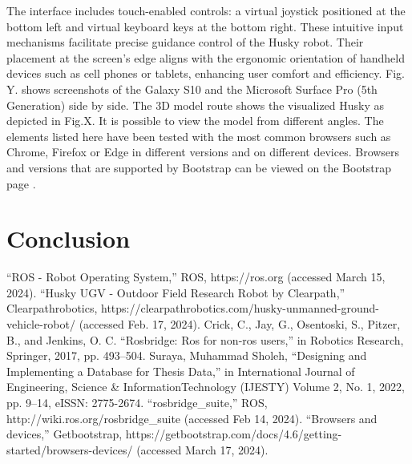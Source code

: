 \documentclass[conference]{IEEEtran}
\begin{document}
The interface includes touch-enabled controls: a virtual joystick positioned at the bottom left and virtual keyboard keys at the bottom right. These intuitive input mechanisms facilitate precise guidance control of the Husky robot. Their placement at the screen's edge aligns with the ergonomic orientation of handheld devices such as cell phones or tablets, enhancing user comfort and efficiency. 
Fig. Y. shows screenshots of the Galaxy S10 and the Microsoft Surface Pro (5th Generation) side by side.
The 3D model route shows the visualized Husky as depicted in Fig.X. It is possible to view the model from different angles.
The elements listed here have been tested with the most common browsers such as Chrome, Firefox or Edge in different versions and on different devices. Browsers and versions that are supported by Bootstrap can be viewed on the Bootstrap page \cite{bsBrowsers}. 






\section{Conclusion}

\begin{thebibliography}{00}
 ``ROS - Robot Operating System,''
ROS,
https://ros.org
(accessed March 15, 2024).
``Husky UGV - Outdoor Field Research Robot by Clearpath,''
Clearpathrobotics,
https://clearpathrobotics.com/husky-unmanned-ground-vehicle-robot/
(accessed Feb. 17, 2024).
 Crick, C., Jay, G., Osentoski, S., Pitzer, B., and Jenkins, O. C. ``Rosbridge: Ros
for non-ros users,'' in Robotics Research, Springer, 2017, pp. 493--504.
 Suraya, Muhammad Sholeh, ``Designing and Implementing a Database for Thesis Data,'' in International Journal of Engineering, Science \& InformationTechnology (IJESTY)
Volume 2, No. 1, 2022, pp. 9--14, eISSN: 2775-2674.
``rosbridge\_suite,'' 
ROS,
http://wiki.ros.org/rosbridge\_suite
(accessed Feb 14, 2024).
``Browsers and devices,'' 
Getbootstrap, 
https://getbootstrap.com/docs/4.6/getting-started/browsers-devices/ 
(accessed March 17, 2024).
\end{thebibliography}
\vspace{12pt}
\end{document}
